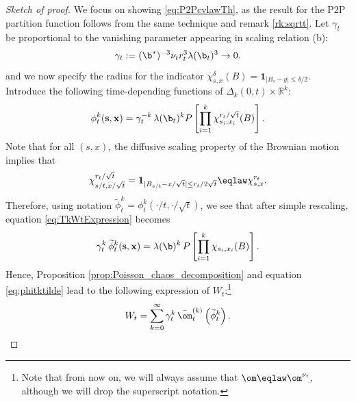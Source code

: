 \begin{proof}[Sketch of proof]
We focus on showing \eqref{eq:P2PcvlawTh}, as the result for the P2P partition function follows from the same technique and remark \ref{rk:sqrtt}. Let $\gamma_t$ be proportional to the vanishing parameter appearing in scaling relation (b):
\begin{equation}
\gamma_t := (\b^*)^{-3} \nu_t r_t^3 \lambda(\b_t)^3 \to 0.
\end{equation}
and we now specify the radius for the indicator $\chi_{s,x}^{\delta}(B) = \mathbf{1}_{|B_s-y|\leq \delta/2}$.
Introduce the following time-depending functions of $\Delta_k(0,t)\times\mathbb{R}^k$:
\begin{equation}
\phi_t^k(\mathbf{s},\mathbf{x}) = \gamma_t^{-k} \, \lambda(\b_t) ^k P\left[\prod_{i=1}^k \chi_{s_i,x_i}^{r_t/\sqrt{t}} (B)\right].
\end{equation} 
Note that for all $(s,x)$, the diffusive scaling property of the Brownian motion implies that
\[\chi_{s/t,x/\sqrt{t}}^{r_t/\sqrt{t}} = \mathbf{1}_{|B_{s/t} - x/\sqrt{t}| \leq r_t/2\sqrt{t}} \eqlaw \chi^{r_t}_{s,x}.\]
Therefore, using notation $\widetilde{\phi}_t^k = \phi_t^k(\cdot/t,\cdot/\sqrt{t})$, we see that after simple rescaling, equation \eqref{eq:TkWtExpression} becomes
\begin{equation} \label{eq:phitktilde} \gamma_t^k \, \widetilde{\phi}_t^k(\mathbf{s},\mathbf{x}) = \lambda(\b)^k\, P\left[\prod_{i=1}^k \chi_{s_i,x_i}(B) \right].
\end{equation}
Hence, Proposition \eqref{prop:Poisson_chaos_decomposition} and equation \eqref{eq:phitktilde} lead to the following expression of $W_t$:\footnote{Note that from now on, we will always assume that $\om\eqlaw\om^{\nu_t}$, although we will drop the superscript notation.}
\begin{equation} \label{eq:WtExpansionTwo}
W_t = \sum_{k=0}^\infty \gamma_t^k \, \bar{\om}^{(k)}_t \left(\widetilde{\phi}_t^k\right).
\end{equation}


\end{proof}
